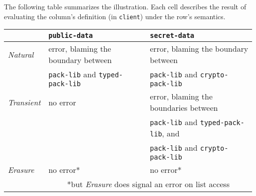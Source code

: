 The following table summarizes the illustration. Each cell describes the result
of evaluating the column's definition (in {\tt client}) under the row's
semantics.
\begin{center}
  \begin{tabular}{l|l@{\qquad}l}
                  & {\tt public-data}              & {\tt secret-data}                                 \\
\hline %
{\it Natural\/}   & error, blaming the boundary between & error, blaming the boundary between          \\
                  & {\tt pack-lib} and {\tt typed-pack-lib} & {\tt pack-lib} and {\tt crypto-pack-lib} \\
\hline
{\it Transient\/} & no error                       & error, blaming the boundaries between            \\
                  &                                & {\tt pack-lib}  and {\tt typed-pack-lib}, and \\
                  &                                & {\tt  pack-lib} and {\tt crypto-pack-lib}     \\
\hline
 {\it Erasure\/}   & no error*                      & no error*                                         \\
                  &   \multicolumn{2}{|c}{*but {\em Erasure} does signal an error on list access}
\end{tabular}
\end{center}


